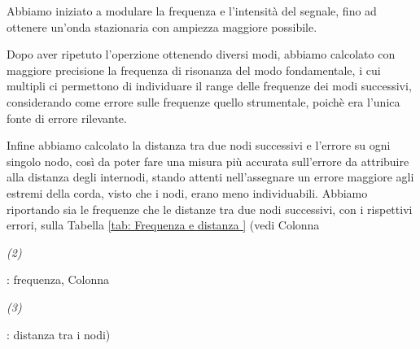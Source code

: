 \documentclass[12pt, a4paper]{article}
\begin{document}
Abbiamo iniziato a modulare la frequenza e l'intensità del segnale, fino ad ottenere un'onda stazionaria con ampiezza maggiore possibile.
\bigskip

Dopo aver ripetuto l'operzione ottenendo diversi modi, abbiamo calcolato con maggiore precisione la frequenza di risonanza del modo fondamentale, i cui multipli ci permettono di individuare il range delle frequenze dei modi successivi, considerando come errore sulle frequenze quello strumentale, poichè era l'unica fonte di errore rilevante.
 \bigskip
 
Infine abbiamo calcolato la distanza tra due nodi successivi e l'errore su ogni singolo nodo, così da poter fare una misura più accurata sull'errore da attribuire alla distanza degli internodi, stando attenti nell'assegnare un errore maggiore agli estremi della corda, visto che i nodi, erano meno individuabili. Abbiamo riportando sia le frequenze che le distanze tra due nodi successivi, con i rispettivi errori, sulla Tabella \ref{tab: Frequenza e distanza } (vedi Colonna \begin{footnotesize}{\textit{(2)}}\end{footnotesize}: frequenza, Colonna \begin{footnotesize}{\textit{(3)}}\end{footnotesize}: distanza tra i nodi) 
\end{document}
